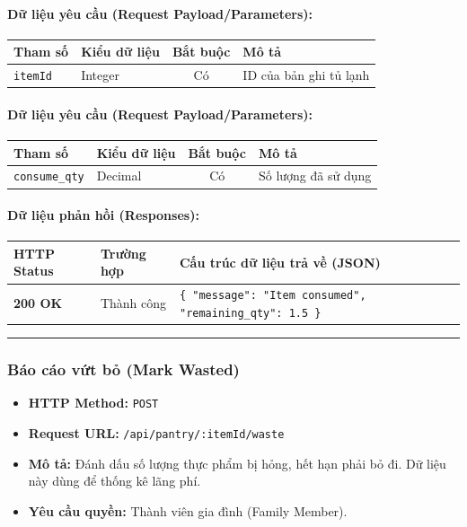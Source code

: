 \documentclass[12pt,a4paper]{article}
\begin{document}
\paragraph{Dữ liệu yêu cầu (Request Payload/Parameters):}
\begin{longtable}{|p{2.8cm}|p{2.2cm}|c|p{7.0cm}|}
\hline
\textbf{Tham số} & \textbf{Kiểu dữ liệu} & \textbf{Bắt buộc} & \textbf{Mô tả} \\ \hline
\endhead
\texttt{itemId} & Integer & Có & ID của bản ghi tủ lạnh \\ \hline
\end{longtable}

\paragraph{Dữ liệu yêu cầu (Request Payload/Parameters):}
\begin{longtable}{|p{2.8cm}|p{2.2cm}|c|p{7.0cm}|}
\hline
\textbf{Tham số} & \textbf{Kiểu dữ liệu} & \textbf{Bắt buộc} & \textbf{Mô tả} \\ \hline
\endhead
\texttt{consume\_qty} & Decimal & Có & Số lượng đã sử dụng \\ \hline
\end{longtable}

\paragraph{Dữ liệu phản hồi (Responses):}
\begin{longtable}{|p{2.8cm}|p{3.2cm}|p{8.0cm}|}
\hline
\textbf{HTTP Status} & \textbf{Trường hợp} & \textbf{Cấu trúc dữ liệu trả về (JSON)} \\ \hline
\endhead
\textbf{200 OK} & Thành công & \texttt{\{ "message": "Item consumed", "remaining\_qty": 1.5 \}} \\ \hline
\end{longtable}

\vskip 0.4cm
\noindent\rule{\textwidth}{0.3pt}
\vskip 0.4cm

\subsubsection{Báo cáo vứt bỏ (Mark Wasted)}
\begin{itemize}[leftmargin=*]
    \item \textbf{HTTP Method:} \texttt{POST}
    \item \textbf{Request URL:} \texttt{/api/pantry/:itemId/waste}
    \item \textbf{Mô tả:} Đánh dấu số lượng thực phẩm bị hỏng, hết hạn phải bỏ đi. Dữ liệu này dùng để thống kê lãng phí.
    \item \textbf{Yêu cầu quyền:} Thành viên gia đình (Family Member).
\end{itemize}
\end{document}
